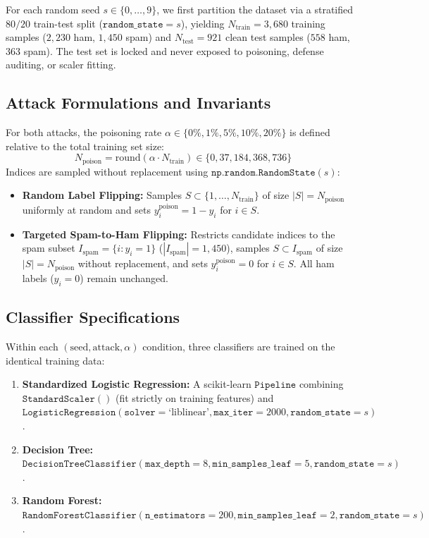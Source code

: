 \documentclass[10pt,conference]{IEEEtran}
\begin{document}
For each random seed $s \in \{0, \dots, 9\}$, we first partition the dataset via a stratified $80/20$ train-test split ($\mathtt{random\_state}=s$), yielding $N_{\text{train}} = 3,680$ training samples ($2,230$ ham, $1,450$ spam) and $N_{\text{test}} = 921$ clean test samples ($558$ ham, $363$ spam). The test set is locked and never exposed to poisoning, defense auditing, or scaler fitting.

\subsection{Attack Formulations and Invariants}
For both attacks, the poisoning rate $\alpha \in \{0\%, 1\%, 5\%, 10\%, 20\%\}$ is defined relative to the total training set size:
\begin{equation}
N_{\text{poison}} = \text{round}(\alpha \cdot N_{\text{train}}) \in \{0, 37, 184, 368, 736\}
\end{equation}
Indices are sampled without replacement using $\mathtt{np.random.RandomState}(s)$:
\begin{itemize}
    \item \textbf{Random Label Flipping:} Samples $S \subset \{1, \dots, N_{\text{train}}\}$ of size $|S| = N_{\text{poison}}$ uniformly at random and sets $y_i^{\text{poison}} = 1 - y_i$ for $i \in S$.
    \item \textbf{Targeted Spam-to-Ham Flipping:} Restricts candidate indices to the spam subset $I_{\text{spam}} = \{i : y_i = 1\}$ ($|I_{\text{spam}}| = 1,450$), samples $S \subset I_{\text{spam}}$ of size $|S| = N_{\text{poison}}$ without replacement, and sets $y_i^{\text{poison}} = 0$ for $i \in S$. All ham labels ($y_i = 0$) remain unchanged.
\end{itemize}

\subsection{Classifier Specifications}
Within each $(\text{seed}, \text{attack}, \alpha)$ condition, three classifiers are trained on the identical training data:
\begin{enumerate}
    \item \textbf{Standardized Logistic Regression:} A scikit-learn $\mathtt{Pipeline}$ combining $\mathtt{StandardScaler()}$ (fit strictly on training features) and $\mathtt{LogisticRegression}(\mathtt{solver}=\text{`liblinear'}, \mathtt{max\_iter}=2000, \mathtt{random\_state}=s)$.
    \item \textbf{Decision Tree:} $\mathtt{DecisionTreeClassifier}(\mathtt{max\_depth}=8, \mathtt{min\_samples\_leaf}=5, \mathtt{random\_state}=s)$.
    \item \textbf{Random Forest:} $\mathtt{RandomForestClassifier}(\mathtt{n\_estimators}=200, \mathtt{min\_samples\_leaf}=2, \mathtt{random\_state}=s)$ \cite{breiman2001random}.
\end{enumerate}
\end{document}
